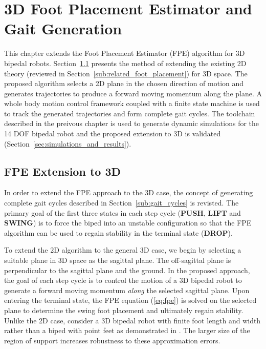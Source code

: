 \chapter{3D Foot Placement Estimator and Gait Generation} %
\label{cha:simulations}

This chapter extends the Foot Placement Estimator (FPE) algorithm for 3D bipedal robots. Section~\ref{sec:extension_to_3d} presents the method of extending the existing 2D theory (reviewed in Section~\ref{sub:related_foot_placement}) for 3D space. The proposed algorithm selects a 2D plane in the chosen direction of motion and generates trajectories to produce a forward moving momentum along the plane. A whole body motion control framework coupled with a finite state machine is used to track the generated trajectories and form complete gait cycles. The toolchain described in the preivous chapter is used to generate dynamic simulations for the 14 DOF bipedal robot and the proposed extension to 3D is validated (Section~\ref{sec:simulations_and_results}).

\section{FPE Extension to 3D} %
\label{sec:extension_to_3d}

In order to extend the FPE approach to the 3D case, the concept of generating complete gait cycles described in Section~\ref{sub:gait_cycles} is revisted. The primary goal of the first three states in each step cycle (\textbf{PUSH}, \textbf{LIFT} and \textbf{SWING}) is to force the biped into an unstable configuration so that the FPE algorithm can be used to regain stability in the terminal state (\textbf{DROP}).

To extend the 2D algorithm to the general 3D case, we begin by selecting a suitable plane in 3D space as the sagittal plane. The off-sagittal plane is perpendicular to the sagittal plane and the ground.  In the proposed approach, the goal of each step cycle is to control the motion of a 3D bipedal robot to generate a forward moving momentum \emph{along} the selected sagittal plane. Upon entering the terminal state, the FPE equation (\ref{eq:fpe}) is solved on the selected plane to determine the swing foot placement and ultimately regain stability. Unlike the 2D case, consider a 3D bipedal robot with finite foot length and width rather than a biped with point feet as demonstrated in \cite{Wight:2008vt}. The larger size of the region of support increases robustness to these approximation errors. 

